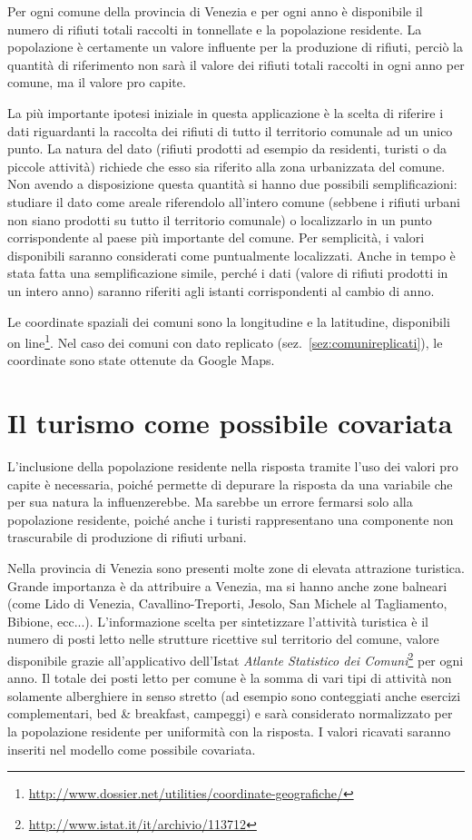 \documentclass[a4paper,11pt,twoside,openright]{book}							%
\begin{document}
Per ogni comune della provincia di Venezia e per ogni anno è disponibile il numero di rifiuti totali raccolti in tonnellate e la popolazione residente. La popolazione è certamente un valore influente per la produzione di rifiuti, perciò la quantità di riferimento non sarà il valore dei rifiuti totali raccolti in ogni anno per comune, ma il valore pro capite.

La più importante ipotesi iniziale in questa applicazione è la scelta di riferire i dati riguardanti la raccolta dei rifiuti di tutto il territorio comunale ad un unico punto. La natura del dato (rifiuti prodotti ad esempio da residenti, turisti o da piccole attività) richiede che esso sia riferito alla zona urbanizzata del comune. Non avendo a disposizione questa quantità si hanno due possibili semplificazioni: studiare il dato come areale riferendolo all'intero comune (sebbene i rifiuti urbani non siano prodotti su tutto il territorio comunale) o localizzarlo in un punto corrispondente al paese più importante del comune. Per semplicità, i valori disponibili saranno considerati come puntualmente localizzati. Anche in tempo è stata fatta una semplificazione simile, perché i dati (valore di rifiuti prodotti in un intero anno) saranno riferiti agli istanti corrispondenti al cambio di anno.

Le coordinate spaziali dei comuni sono la longitudine e la latitudine, disponibili on line\footnote{\href{http://www.dossier.net/utilities/coordinate-geografiche/}{http://www.dossier.net/utilities/coordinate-geografiche/}}. Nel caso dei comuni con dato replicato (sez.~\ref{sez:comunireplicati}), le coordinate sono state ottenute da Google Maps.
\section{Il turismo come possibile covariata}

L'inclusione della popolazione residente nella risposta tramite l'uso dei valori pro capite è necessaria, poiché permette di depurare la risposta da una variabile che per sua natura la influenzerebbe. Ma sarebbe un errore fermarsi solo alla popolazione residente, poiché anche i turisti rappresentano una componente non trascurabile di produzione di rifiuti urbani.

Nella provincia di Venezia sono presenti molte zone di elevata attrazione turistica. Grande importanza è da attribuire a Venezia, ma si hanno anche zone balneari (come Lido di Venezia, Cavallino-Treporti, Jesolo, San Michele al Tagliamento, Bibione, ecc...). L'informazione scelta per sintetizzare l'attività turistica è il numero di posti letto nelle strutture ricettive sul territorio del comune, valore disponibile grazie all'applicativo dell'Istat \textit{Atlante Statistico dei Comuni}\footnote{\href{http://www.istat.it/it/archivio/113712}{http://www.istat.it/it/archivio/113712}} per ogni anno. Il totale dei posti letto per comune è la somma di vari tipi di attività non solamente alberghiere in senso stretto (ad esempio sono conteggiati anche esercizi complementari, bed \& breakfast, campeggi) e sarà considerato normalizzato per la popolazione residente per uniformità con la risposta. I valori ricavati saranno inseriti nel modello come possibile covariata.
\newpage
\end{document}
